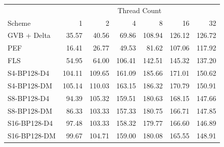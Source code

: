 \begin{tabular}{lrrrrrr}
\toprule
 & \multicolumn{6}{c}{Thread Count} \\
Scheme & 1 & 2 & 4 & 8 & 16 & 32 \\
\midrule
GVB + Delta & 35.57 & 40.56 & 69.86 & 108.94 & 126.12 & 126.72 \\
PEF & 16.41 & 26.77 & 49.53 & 81.62 & 107.06 & 117.92 \\
FLS & 54.95 & 64.00 & 106.41 & 142.51 & 145.32 & 137.20 \\
S4-BP128-D4 & 104.11 & 109.65 & 161.09 & 185.66 & 171.01 & 150.62 \\
S4-BP128-DM & 105.14 & 110.03 & 163.15 & 186.32 & 170.79 & 150.91 \\
S8-BP128-D4 & 94.39 & 105.32 & 159.51 & 180.63 & 168.15 & 147.66 \\
S8-BP128-DM & 86.33 & 103.33 & 157.33 & 180.75 & 166.71 & 147.85 \\
S16-BP128-D4 & 97.48 & 103.33 & 158.32 & 179.77 & 166.60 & 146.89 \\
S16-BP128-DM & 99.67 & 104.71 & 159.00 & 180.08 & 165.55 & 148.91 \\
\bottomrule
\end{tabular}

